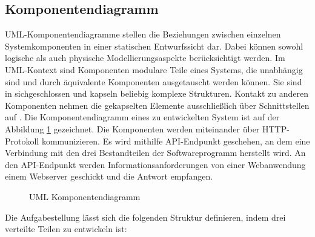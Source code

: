\subsection{Komponentendiagramm}
\label{sec:design:uml:uml_component}
UML-Komponentendiagramme stellen die Beziehungen zwischen einzelnen Systemkomponenten in einer statischen Entwurfssicht dar. Dabei können sowohl logische als auch physische Modellierungsaspekte berücksichtigt werden. Im UML-Kontext sind Komponenten modulare Teile eines Systems, die unabhängig sind und durch äquivalente Komponenten ausgetauscht werden können. Sie sind in sichgeschlossen und kapseln beliebig komplexe Strukturen. Kontakt zu anderen Komponenten nehmen die gekapselten Elemente ausschließlich über Schnittstellen auf \cite{website:20}. Die Komponentendiagramm eines zu entwickelten System ist auf der Abbildung \ref{fig:components} gezeichnet. Die Komponenten werden miteinander über HTTP-Protokoll kommunizieren. Es wird mithilfe API-Endpunkt geschehen, an dem eine Verbindung mit den drei Bestandteilen der Softwareprogramm herstellt wird. An den API-Endpunkt werden Informationsanforderungen von einer Webanwendung einem Webserver geschickt und die Antwort empfangen.
\begin{figure}
	\centering
	\caption{UML Komponentendiagramm}
	\label{fig:components}
\end{figure}
Die Aufgabestellung lässt sich die folgenden Struktur definieren, indem drei verteilte Teilen zu entwickeln ist:
